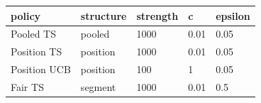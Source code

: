 \begin{tabular}{lllll}
\hline
policy & structure & strength & c & epsilon \\
\hline
Pooled TS & pooled & 1000 & 0.01 & 0.05 \\
Position TS & position & 1000 & 0.01 & 0.05 \\
Position UCB & position & 100 & 1 & 0.05 \\
Fair TS & segment & 1000 & 0.01 & 0.5 \\
\hline
\end{tabular}